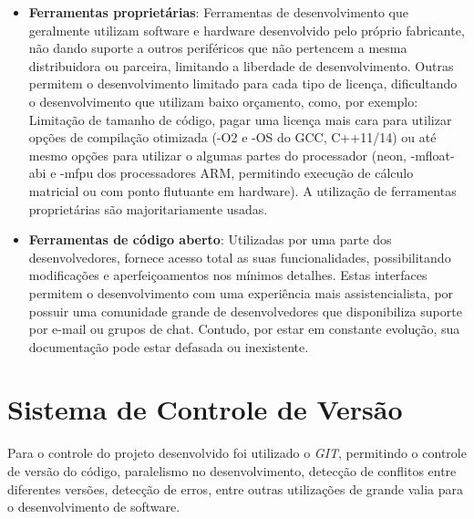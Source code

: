 \begin{itemize}
 \item \textbf{Ferramentas proprietárias}: Ferramentas de desenvolvimento que geralmente utilizam software e hardware desenvolvido pelo próprio fabricante, não dando suporte a outros periféricos que não pertencem a mesma distribuidora ou parceira, limitando a liberdade de desenvolvimento. Outras permitem o desenvolvimento limitado para cada tipo de licença, dificultando o desenvolvimento que utilizam baixo orçamento, como, por exemplo: Limitação de tamanho de código\cite{simplicity}, pagar uma licença mais cara para utilizar opções de compilação otimizada (-O2 e -OS do GCC, C++11/14)\cite{armdeveloper} ou até mesmo opções para utilizar o algumas partes do processador (neon, -mfloat-abi e -mfpu dos processadores ARM, permitindo execução de cálculo matricial ou com ponto flutuante em hardware)\cite{neon}. A utilização de ferramentas proprietárias são majoritariamente usadas.

 \item \textbf{Ferramentas de código aberto}: Utilizadas por uma parte dos desenvolvedores, fornece acesso total as suas funcionalidades, possibilitando modificações e aperfeiçoamentos nos mínimos detalhes. Estas interfaces permitem o desenvolvimento com uma experiência mais assistencialista, por possuir uma comunidade grande de desenvolvedores que disponibiliza suporte por e-mail ou grupos de chat. Contudo, por estar em constante evolução, sua documentação pode estar defasada ou inexistente.

\end{itemize}

\section{Sistema de Controle de Versão}

Para o controle do projeto desenvolvido foi utilizado o \textit{GIT}, permitindo o controle de versão do código, paralelismo no desenvolvimento, detecção de conflitos entre diferentes versões, detecção de erros, entre outras utilizações de grande valia
para o desenvolvimento de software.

